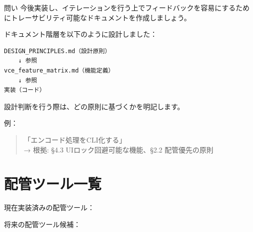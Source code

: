 \documentclass[10pt,a4paper,twocolumn]{ltjsarticle}
\begin{document}
\begin{itembox}[l]{問い}
今後実装し、イテレーションを行う上でフィードバックを容易にするためにトレーサビリティ可能なドキュメントを作成しましょう。
\end{itembox}

ドキュメント階層を以下のように設計しました：

\begin{lstlisting}
DESIGN_PRINCIPLES.md（設計原則）
    ↓ 参照
vce_feature_matrix.md（機能定義）
    ↓ 参照
実装（コード）
\end{lstlisting}

設計判断を行う際は、どの原則に基づくかを明記します。

例：
\begin{quote}
「エンコード処理をCLI化する」\\
→ 根拠: §4.3 UIロック回避可能な機能、§2.2 配管優先の原則
\end{quote}

\section{配管ツール一覧}

現在実装済みの配管ツール：

\vspace{0.5\baselineskip}
\vspace{0.5\baselineskip}

将来の配管ツール候補：

\vspace{0.5\baselineskip}
\vspace{0.5\baselineskip}
\end{document}

